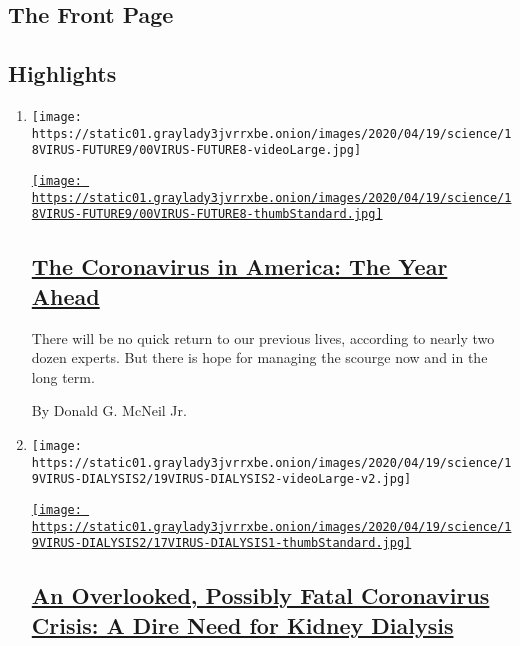\hypertarget{the-front-page}{%
\subsection{The Front Page}\label{the-front-page}}

\hypertarget{highlights}{%
\subsection{Highlights}\label{highlights}}

\begin{enumerate}
\def\labelenumi{\arabic{enumi}.}
\item
  \texttt{[image: https://static01.graylady3jvrrxbe.onion/images/2020/04/19/science/18VIRUS-FUTURE9/00VIRUS-FUTURE8-videoLarge.jpg]}

  \href{/2020/04/18/health/coronavirus-america-future.html}{\texttt{[image: https://static01.graylady3jvrrxbe.onion/images/2020/04/19/science/18VIRUS-FUTURE9/00VIRUS-FUTURE8-thumbStandard.jpg]}}

  \hypertarget{the-coronavirus-in-america-the-year-ahead}{%
  \subsection{\texorpdfstring{\href{/2020/04/18/health/coronavirus-america-future.html}{The
  Coronavirus in America: The Year
  Ahead}}{The Coronavirus in America: The Year Ahead}}\label{the-coronavirus-in-america-the-year-ahead}}

  There will be no quick return to our previous lives, according to
  nearly two dozen experts. But there is hope for managing the scourge
  now and in the long term.

  By Donald G. McNeil Jr.
\item
  \texttt{[image: https://static01.graylady3jvrrxbe.onion/images/2020/04/19/science/19VIRUS-DIALYSIS2/19VIRUS-DIALYSIS2-videoLarge-v2.jpg]}

  \href{/2020/04/18/health/kidney-dialysis-coronavirus.html}{\texttt{[image: https://static01.graylady3jvrrxbe.onion/images/2020/04/19/science/19VIRUS-DIALYSIS2/17VIRUS-DIALYSIS1-thumbStandard.jpg]}}

  \hypertarget{an-overlooked-possibly-fatal-coronavirus-crisis-a-dire-need-for-kidney-dialysis}{%
  \subsection{\texorpdfstring{\href{/2020/04/18/health/kidney-dialysis-coronavirus.html}{An
  Overlooked, Possibly Fatal Coronavirus Crisis: A Dire Need for Kidney
  Dialysis}}{An Overlooked, Possibly Fatal Coronavirus Crisis: A Dire Need for Kidney Dialysis}}\label{an-overlooked-possibly-fatal-coronavirus-crisis-a-dire-need-for-kidney-dialysis}}


\end{enumerate}
